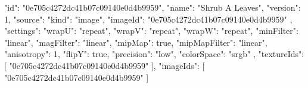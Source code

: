 {
  "id": "0e705c4272dc41b07c09140e0d4b9959",
  "name": "Shrub A Leaves",
  "version": 1,
  "source": {
    "kind": "image",
    "imageId": "0e705c4272dc41b07c09140e0d4b9959"
  },
  "settings": {
    "wrapU": "repeat",
    "wrapV": "repeat",
    "wrapW": "repeat",
    "minFilter": "linear",
    "magFilter": "linear",
    "mipMap": true,
    "mipMapFilter": "linear",
    "anisotropy": 1,
    "flipY": true,
    "precision": "low",
    "colorSpace": "srgb"
  },
  "textureIds": [
    "0e705c4272dc41b07c09140e0d4b9959"
  ],
  "imageIds": [
    "0e705c4272dc41b07c09140e0d4b9959"
  ]
}
